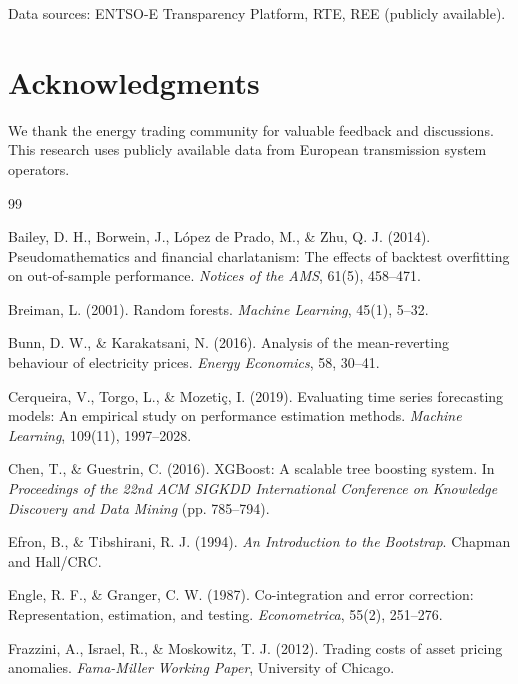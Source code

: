 \documentclass[12pt,a4paper]{article}
\begin{document}
Data sources: ENTSO-E Transparency Platform, RTE, REE (publicly available).

\section*{Acknowledgments}

We thank the energy trading community for valuable feedback and discussions. This research uses publicly available data from European transmission system operators.


\begin{thebibliography}{99}

Bailey, D. H., Borwein, J., L{\'o}pez de Prado, M., \& Zhu, Q. J. (2014).
\newblock Pseudomathematics and financial charlatanism: The effects of backtest overfitting on out-of-sample performance.
\newblock \textit{Notices of the AMS}, 61(5), 458--471.

Breiman, L. (2001).
\newblock Random forests.
\newblock \textit{Machine Learning}, 45(1), 5--32.

Bunn, D. W., \& Karakatsani, N. (2016).
\newblock Analysis of the mean-reverting behaviour of electricity prices.
\newblock \textit{Energy Economics}, 58, 30--41.

Cerqueira, V., Torgo, L., \& Mozetiç, I. (2019).
\newblock Evaluating time series forecasting models: An empirical study on performance estimation methods.
\newblock \textit{Machine Learning}, 109(11), 1997--2028.

Chen, T., \& Guestrin, C. (2016).
\newblock XGBoost: A scalable tree boosting system.
\newblock In \textit{Proceedings of the 22nd ACM SIGKDD International Conference on Knowledge Discovery and Data Mining} (pp. 785--794).

Efron, B., \& Tibshirani, R. J. (1994).
\newblock \textit{An Introduction to the Bootstrap}.
\newblock Chapman and Hall/CRC.

Engle, R. F., \& Granger, C. W. (1987).
\newblock Co-integration and error correction: Representation, estimation, and testing.
\newblock \textit{Econometrica}, 55(2), 251--276.

Frazzini, A., Israel, R., \& Moskowitz, T. J. (2012).
\newblock Trading costs of asset pricing anomalies.
\newblock \textit{Fama-Miller Working Paper}, University of Chicago.


\end{thebibliography}
\end{document}
